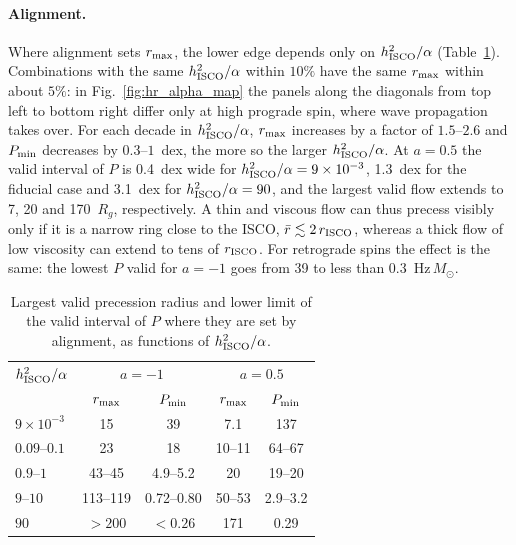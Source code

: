 \paragraph{Alignment.}
Where alignment sets $r_\textup{max}$, the lower edge depends only on $h_\textup{ISCO}^{2}/\alpha$ (Table~\ref{tab:hr_alpha}).
Combinations with the same $h_\textup{ISCO}^{2}/\alpha$ within $10\%$ have the same $r_\textup{max}$ within about $5\%$: in Fig.~\ref{fig:hr_alpha_map} the panels along the diagonals from top left to bottom right differ only at high prograde spin, where wave propagation takes over.
For each decade in $h_\textup{ISCO}^{2}/\alpha$, $r_\textup{max}$ increases by a factor of $1.5$--$2.6$ and $P_\textup{min}$ decreases by $0.3$--$1$~dex, the more so the larger $h_\textup{ISCO}^{2}/\alpha$.
At $a=0.5$ the valid interval of $P$ is 0.4~dex wide for $h_\textup{ISCO}^{2}/\alpha=9\times10^{-3}$, 1.3~dex for the fiducial case and 3.1~dex for $h_\textup{ISCO}^{2}/\alpha=90$, and the largest valid flow extends to 7, 20 and 170~$R_g$, respectively.
A thin and viscous flow can thus precess visibly only if it is a narrow ring close to the ISCO, $\bar r\lesssim2\,r_\textup{ISCO}$, whereas a thick flow of low viscosity can extend to tens of $r_\textup{ISCO}$.
For retrograde spins the effect is the same: the lowest $P$ valid for $a=-1$ goes from 39 to less than 0.3~Hz\,$M_\odot$.

\begin{table}
\caption{Largest valid precession radius and lower limit of the valid interval of $P$ where they are set by alignment, as functions of $h_\textup{ISCO}^{2}/\alpha$.}
\label{tab:hr_alpha}
\centering
\begin{tabular}{lcccc}
\hline\hline
$h_\textup{ISCO}^{2}/\alpha$ & \multicolumn{2}{c}{$a=-1$} & \multicolumn{2}{c}{$a=0.5$} \\
 & $r_\textup{max}$ & $P_\textup{min}$ & $r_\textup{max}$ & $P_\textup{min}$ \\
\hline
$9\times10^{-3}$ & 15       & 39          & 7.1      & 137 \\
$0.09$--$0.1$    & 23       & 18          & 10--11   & 64--67 \\
$0.9$--$1$       & 43--45   & 4.9--5.2    & 20       & 19--20 \\
$9$--$10$        & 113--119 & 0.72--0.80  & 50--53   & 2.9--3.2 \\
$90$             & $>200$   & $<0.26$     & 171      & 0.29 \\
\hline
\end{tabular}
\end{table}

